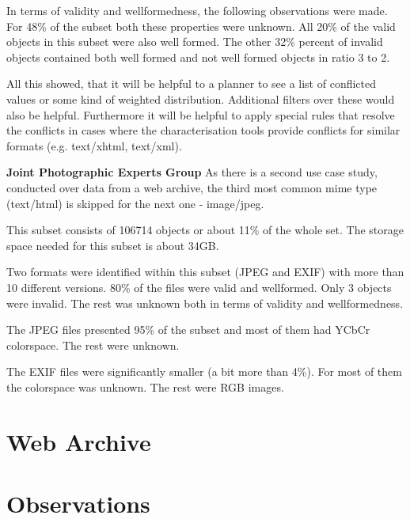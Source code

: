 In terms of validity and wellformedness, the following observations were made. For 48\% of the subset both these properties were unknown. All 20\% of the valid objects in this subset were also well formed. The other 32\% percent of invalid objects contained both well formed and not well formed objects in ratio 3 to 2.

All this showed, that it will be helpful to a planner to see a list of conflicted values or some kind of weighted distribution. Additional filters over these would also be helpful. Furthermore it will be helpful to apply special rules that resolve the conflicts in cases where the characterisation tools provide conflicts for similar formats (e.g. text/xhtml, text/xml).\newline

\textbf{Joint Photographic Experts Group}\newline
As there is a second use case study, conducted over data from a web archive, the third most common mime type (text/html) is skipped for the next one - image/jpeg.

This subset consists of 106714 objects or about 11\% of the whole set. The storage space needed for this subset is about 34GB.

Two formats were identified within this subset (JPEG and EXIF) with more than 10 different versions.
80\% of the files were valid and wellformed. Only 3 objects were invalid. The rest was unknown both in terms of validity and wellformedness.

The JPEG files presented 95\% of the subset and most of them had YCbCr colorspace. The rest were unknown.

The EXIF files were significantly smaller (a bit more than 4\%). For most of them the colorspace was unknown. The rest were RGB images.


\section{Web Archive}

\section{Observations}